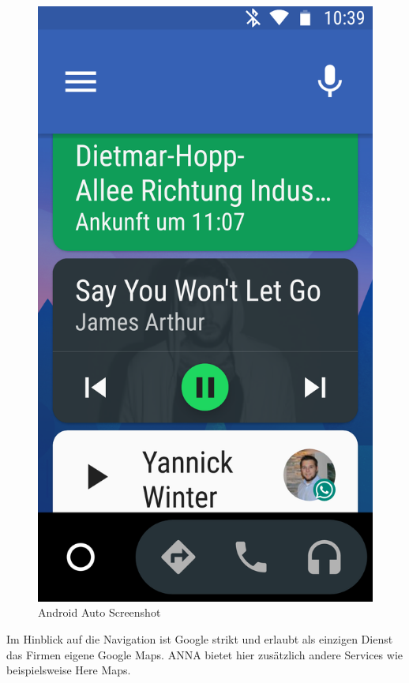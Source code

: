 \begin{figure}[h]
	\centering
  \includegraphics[scale=0.18]{images/Android_Auto.png}
	\caption{Android Auto Screenshot}
	\label{figAndroidAuto}
\end{figure}
Im Hinblick auf die Navigation ist Google strikt und erlaubt als einzigen Dienst das Firmen eigene Google Maps. \ac{ANNA} bietet hier zusätzlich andere Services wie beispielsweise Here Maps.

